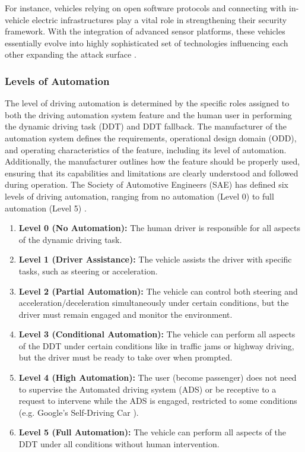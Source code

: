 For instance, vehicles relying on open software protocols and connecting with in-vehicle electric infrastructures play a vital role in strengthening their security framework.
With the integration of advanced sensor platforms, these vehicles essentially evolve into highly sophisticated set of technologies influencing each other expanding the attack surface \cite{sec-by-design} .


\subsubsection{Levels of Automation}\label{subsubsec:levels-of-automation}
The level of driving automation is determined by the specific roles assigned to both the driving automation system feature and the human user in performing the dynamic driving task (DDT) and DDT fallback. \cite{sae_j3016_2021}
The manufacturer of the automation system defines the requirements, operational design domain (ODD), and operating characteristics of the feature, including its level of automation.
Additionally, the manufacturer outlines how the feature should be properly used, ensuring that its capabilities and limitations are clearly understood and followed during operation.
The Society of Automotive Engineers (SAE) has defined six levels of driving automation, ranging from no automation (Level 0) to full automation (Level 5) \cite{sae_j3016_2021}.

\begin{enumerate}
    \item \textbf{Level 0 (No Automation):} The human driver is responsible for all aspects of the dynamic driving task.
    \item \textbf{Level 1 (Driver Assistance):} The vehicle assists the driver with specific tasks, such as steering or acceleration.
    \item \textbf{Level 2 (Partial Automation):} The vehicle can control both steering and acceleration/deceleration simultaneously under certain conditions, but the driver must remain engaged and monitor the environment.
    \item \textbf{Level 3 (Conditional Automation):} The vehicle can perform all aspects of the DDT under certain conditions like in traffic jams or highway driving, but the driver must be ready to take over when prompted.
    \item \textbf{Level 4 (High Automation):} The user (become passenger) does not need to supervise the Automated driving system (ADS) or be receptive to a request to intervene while the
    ADS is engaged, restricted to some conditions (e.g. Google's Self-Driving Car \cite{teoh2017rage}).
    \item \textbf{Level 5 (Full Automation):} The vehicle can perform all aspects of the DDT under all conditions without human intervention.
\end{enumerate}

